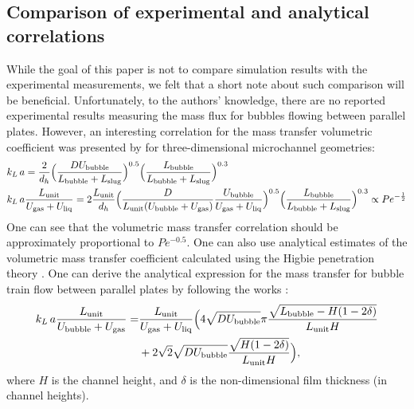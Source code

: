 \documentclass[preprint,12pt]{elsarticle}
\newcommand{\beq}{\begin{equation}}
\newcommand{\feq}{\end{equation}}
\newcommand{\beqal}{\begin{equation}\begin{aligned}}
\newcommand{\feqal}{\end{aligned}\end{equation}}
\newcommand{\vol}{k_L\,a}
\newcommand{\lbubble}{L_{\mathrm{bubble}}}
\newcommand{\lunit}{L_{\mathrm{unit}}}
\newcommand{\lslug}{L_{\mathrm{slug}}}
\newcommand{\ububble}{U_{\mathrm{bubble}}}
\newcommand{\uliq}{U_{\mathrm{liq}}}
\newcommand{\ugas}{U_{\mathrm{gas}}}
\newcommand{\volnondim}{\vol \frac{\lunit}{\ububble+\ugas}}
\begin{document}
\subsection{Comparison of experimental and analytical correlations}
While the goal of this paper is not to compare simulation results with the experimental measurements, 
we felt that a short note about such comparison will be beneficial.
Unfortunately, to the authors' knowledge, there are no reported experimental results measuring the mass flux for
  bubbles flowing between parallel plates. However, an interesting
correlation for the mass transfer volumetric coefficient was presented by
\citet{yue-mass} for three-dimensional microchannel geometries:
\beqal
&\vol=\frac{2}{d_h}\Bigl(\frac{D \ububble}{\lbubble+\lslug}\Bigr)^{0.5}
\Bigl(\frac{\lbubble}{\lbubble+\lslug}\Bigr)^{0.3}\\
&\vol \frac{\lunit}{\ugas+\uliq}=2\frac{\lunit}{d_h} \Bigl(\frac{D 
}{\lunit (\ububble+\ugas)} \frac{\ububble}{\ugas+\uliq}\Bigr)^{0.5}
\Bigl(\frac{\lbubble}{\lbubble+\lslug}\Bigr)^{0.3} \propto Pe^{-\frac{1}{2}}\\
\feqal
One can see that  the volumetric mass transfer correlation should be approximately proportional to
$Pe^{-0.5}$.  One can also use analytical estimates of the volumetric mass transfer
coefficient calculated using the Higbie penetration theory \cite{higbie}. One can derive the analytical expression for the mass transfer for bubble train flow between parallel plates by following the works
\cite{irandoust,vanbaten-circular}:
\beq
\label{vanbaten:analytical:expresssion}
\begin{aligned}
\volnondim=&\frac{\lunit}{\ugas+\uliq}\Bigl(4 \sqrt{D \ububble}{\pi}
\frac{\sqrt{\lbubble-H (1-2\delta)}}{\lunit H}\\
&+2 \sqrt{2} \sqrt{D \ububble} \frac{\sqrt{H
(1-2\delta)}}{\lunit H}\Bigr),
\end{aligned}
\feq
where $H$ is the channel height, and $\delta$ is the non-dimensional film thickness (in channel heights).
\end{document}
